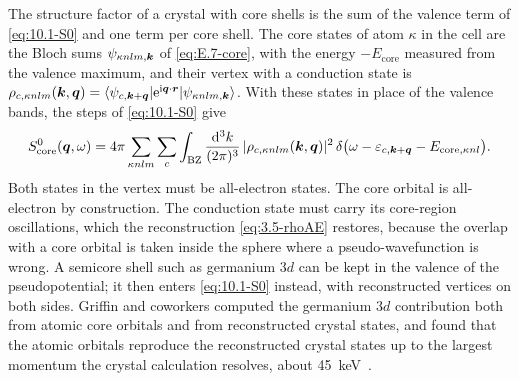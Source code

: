 The structure factor of a crystal with core shells is the sum of the valence term of \cref{eq:10.1-S0} and one term per core shell. The core states of atom $\kappa$ in the cell are the Bloch sums $\psi_{\kappa nlm,\bm{k}}$ of \cref{eq:E.7-core}, with the energy $-E_{\mathrm{core}}$ measured from the valence maximum, and their vertex with a conduction state is $\rho_{c,\kappa nlm}(\bm{k},\bm{q}) = \langle\psi_{c,\bm{k}+\bm{q}}|\mathrm{e}^{\mathrm{i}\bm{q}\cdot\bm{r}}|\psi_{\kappa nlm,\bm{k}}\rangle$. With these states in place of the valence bands, the steps of \cref{eq:10.1-S0} give
\begin{equation}
  S^0_{\mathrm{core}}(\bm{q},\omega) = 4\pi\sum_{\kappa nlm}\sum_c\int_{\mathrm{BZ}}\frac{\mathrm{d}^3k}{(2\pi)^3}\,|\rho_{c,\kappa nlm}(\bm{k},\bm{q})|^2\,\delta\bigl(\omega - \varepsilon_{c,\bm{k}+\bm{q}} - E_{\mathrm{core},\kappa nl}\bigr) .
  \label{eq:10.6-core}
\end{equation}
Both states in the vertex must be all-electron states. The core orbital is all-electron by construction. The conduction state must carry its core-region oscillations, which the reconstruction \cref{eq:3.5-rhoAE} restores, because the overlap with a core orbital is taken inside the sphere where a pseudo-wavefunction is wrong. A semicore shell such as germanium $3d$ can be kept in the valence of the pseudopotential; it then enters \cref{eq:10.1-S0} instead, with reconstructed vertices on both sides. Griffin and coworkers computed the germanium $3d$ contribution both from atomic core orbitals and from reconstructed crystal states, and found that the atomic orbitals reproduce the reconstructed crystal states up to the largest momentum the crystal calculation resolves, about \SI{45}{keV}~\cite[Sects.~2.2 and~3.3]{griffin2021extended}.


